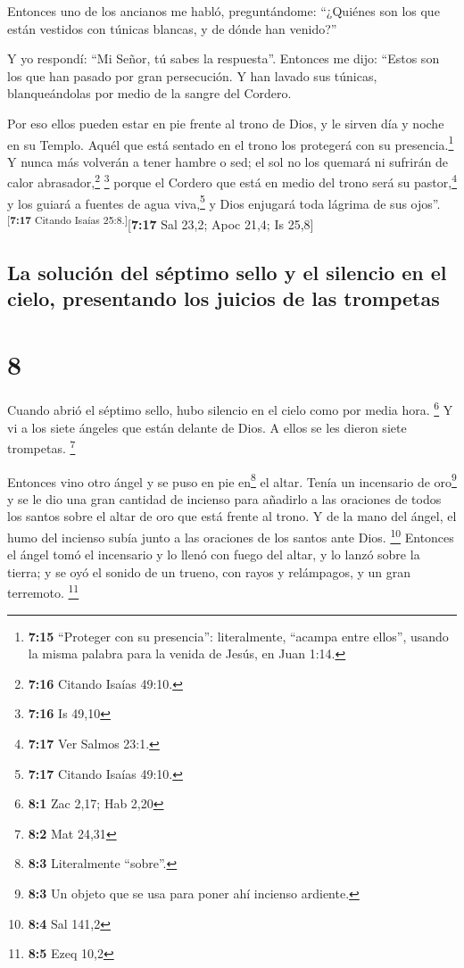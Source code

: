 Entonces uno de los ancianos me habló, preguntándome:
``¿Quiénes son los que están vestidos con túnicas blancas, y de dónde
han venido?''

 Y yo respondí: ``Mi Señor, tú sabes la respuesta''.
Entonces me dijo: ``Estos son los que han pasado por gran persecución. Y
han lavado sus túnicas, blanqueándolas por medio de la sangre del
Cordero.

 Por eso ellos pueden estar en pie frente al trono de
Dios, y le sirven día y noche en su Templo. Aquél que está sentado en el
trono los protegerá con su presencia.\footnote{\textbf{7:15} ``Proteger
  con su presencia'': literalmente, ``acampa entre ellos'', usando la
  misma palabra para la venida de Jesús, en Juan 1:14.} 
Y nunca más volverán a tener hambre o sed; el sol no los quemará ni
sufrirán de calor abrasador,\footnote{\textbf{7:16} Citando Isaías
  49:10.} \footnote{\textbf{7:16} Is 49,10}  porque el
Cordero que está en medio del trono será su pastor,\footnote{\textbf{7:17}
  Ver Salmos 23:1.} y los guiará a fuentes de agua viva,\footnote{\textbf{7:17}
  Citando Isaías 49:10.} y Dios enjugará toda lágrima de sus
ojos''.\textsuperscript{{[}\textbf{7:17} Citando Isaías
25:8.{]}}{[}\textbf{7:17} Sal 23,2; Apoc 21,4; Is 25,8{]}

\hypertarget{la-soluciuxf3n-del-suxe9ptimo-sello-y-el-silencio-en-el-cielo-presentando-los-juicios-de-las-trompetas}{%
\subsection{La solución del séptimo sello y el silencio en el cielo,
presentando los juicios de las
trompetas}\label{la-soluciuxf3n-del-suxe9ptimo-sello-y-el-silencio-en-el-cielo-presentando-los-juicios-de-las-trompetas}}

\hypertarget{section-7}{%
\section{8}\label{section-7}}

 Cuando abrió el séptimo sello, hubo silencio en el cielo
como por media hora. \footnote{\textbf{8:1} Zac 2,17; Hab 2,20}
 Y vi a los siete ángeles que están delante de Dios. A
ellos se les dieron siete trompetas. \footnote{\textbf{8:2} Mat 24,31}

 Entonces vino otro ángel y se puso en pie en\footnote{\textbf{8:3}
  Literalmente ``sobre''.} el altar. Tenía un incensario de
oro\footnote{\textbf{8:3} Un objeto que se usa para poner ahí incienso
  ardiente.} y se le dio una gran cantidad de incienso para añadirlo a
las oraciones de todos los santos sobre el altar de oro que está frente
al trono.  Y de la mano del ángel, el humo del incienso
subía junto a las oraciones de los santos ante Dios. \footnote{\textbf{8:4}
  Sal 141,2}  Entonces el ángel tomó el incensario y lo
llenó con fuego del altar, y lo lanzó sobre la tierra; y se oyó el
sonido de un trueno, con rayos y relámpagos, y un gran terremoto.
\footnote{\textbf{8:5} Ezeq 10,2}

